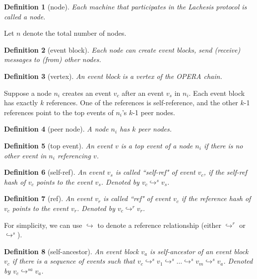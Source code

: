 \documentclass{article}
\newtheorem{defn}{Definition}[section]
\newcommand{\eself}{\hookrightarrow^{s}}
\newcommand{\eref}{\hookrightarrow^{r}}
\newcommand{\eselfancestor}{\hookrightarrow^{sa}}
\newcommand{\erefz}{\hookrightarrow}
\begin{document}
\begin{defn}[node]
	Each machine that participates in the Lachesis protocol is called a node. \end{defn}



Let $n$ denote the total number of nodes.

\begin{defn}[event block]
	Each node can create event blocks, send (receive) messages to (from) other nodes.
\end{defn}

\begin{defn}[vertex]
	An event block is a vertex of the OPERA chain.
\end{defn}



Suppose a node $n_i$ creates an event $v_c$ after an event $v_s$ in $n_i$.  Each event block has exactly $k$ references. One of the references is self-reference, and the other $k$-1 references point to the top events of $n_i$'s $k$-1 peer nodes.


\begin{defn}[peer node]
	A node $n_i$ has $k$ peer nodes.
\end{defn}

\begin{defn}[top event]
	An event $v$ is a top event of a node $n_i$ if there is no other event in $n_i$ referencing $v$.
\end{defn}


\begin{defn}[self-ref]
	An event $v_s$ is called ``self-ref" of event $v_c$, if the self-ref hash of $v_c$ points to the event $v_s$. Denoted by $v_c \eself v_s$.
\end{defn}

\begin{defn}[ref]
	An event $v_r$ is called ``ref" of event $v_c$ if the reference hash of $v_c$ points to the event $v_r$. Denoted by $v_c \eref v_r$.
\end{defn}

For simplicity, we can use $\erefz$ to denote a reference relationship (either $\eref$ or $\eself$).


\begin{defn}[self-ancestor]
	An event block $v_a$ is self-ancestor of an event block $v_c$ if there is a sequence of events such that $v_c \eself v_1 \eself \dots \eself v_m \eself v_a $. Denoted by $v_c \eselfancestor v_a$.
\end{defn}
\end{document}
